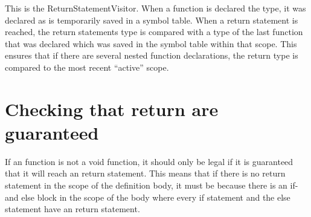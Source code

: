 This is the ReturnStatementVisitor. When a function is declared the type, it was declared as is temporarily saved in a symbol table. When a return statement is reached, the return statements type is compared with a type of the last function that was declared which was saved in the symbol table within that scope. This ensures that if there are several nested function declarations, the return type is compared to the most recent “active” scope.

\noindent\newline


\noindent\newline

\section{Checking that return are guaranteed}
If an function is not a void function, it should only be legal if it is guaranteed that it will reach an return statement. This means that if there is no return statement in the scope of the definition body, it must be because there is an if- and else block in the scope of the body where every if statement and the else statement have an return statement. 

\noindent\newline


\noindent\newline


\noindent\newline